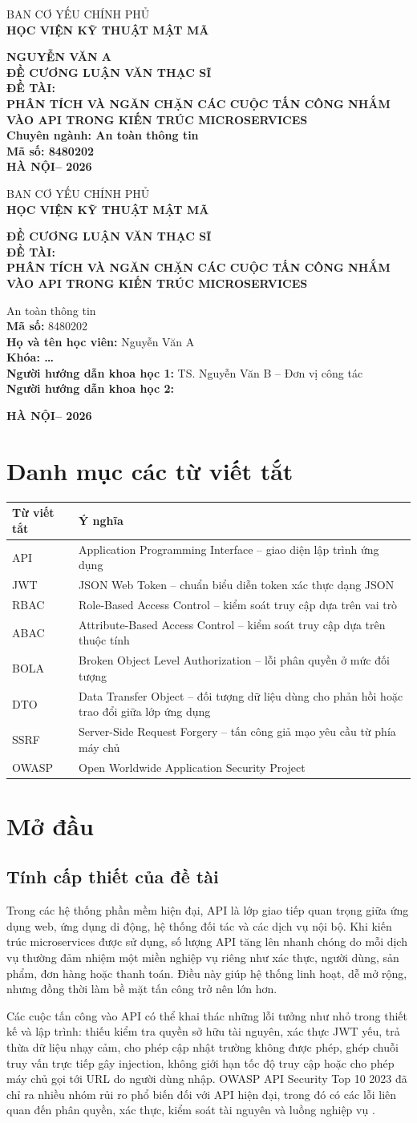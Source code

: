 \documentclass[14pt,a4paper]{extarticle}
\newcommand{\studentname}{Nguyễn Văn A}
\newcommand{\studentclass}{Khóa: \ldots}
\newcommand{\major}{An toàn thông tin}
\newcommand{\majorcode}{8480202}
\newcommand{\supervisorone}{TS. Nguyễn Văn B -- Đơn vị công tác}
\newcommand{\supervisortwo}{}
\newcommand{\city}{HÀ NỘI}
\newcommand{\yearnumber}{2026}
\newcommand{\thesistitle}{PHÂN TÍCH VÀ NGĂN CHẶN CÁC CUỘC TẤN CÔNG NHẮM VÀO API TRONG KIẾN TRÚC MICROSERVICES}
\newcommand{\coverHeader}{
  \begin{center}
    {\MakeUppercase{Ban Cơ yếu Chính phủ}}\\
    {\bfseries\MakeUppercase{Học viện Kỹ thuật Mật mã}}
  \end{center}
}
\newcommand{\mainCover}{
  \thispagestyle{empty}
  \coverHeader
  \vspace{3.2cm}
  \begin{center}
    {\bfseries\MakeUppercase{\studentname}}\\[3.2cm]
    {\bfseries\fontsize{20pt}{24pt}\selectfont ĐỀ CƯƠNG LUẬN VĂN THẠC SĨ}\\[1.2cm]
    {\bfseries ĐỀ TÀI:}\\[0.5cm]
    {\bfseries\MakeUppercase{\thesistitle}}\\[1.2cm]
    {\bfseries Chuyên ngành: \major}\\[0.3cm]
    {\bfseries Mã số: \majorcode}\\
    \vfill
    {\bfseries \city -- \yearnumber}
  \end{center}
  \newpage
}
\newcommand{\subCover}{
  \thispagestyle{empty}
  \coverHeader
  \vspace{2.5cm}
  \begin{center}
    {\bfseries\fontsize{20pt}{24pt}\selectfont ĐỀ CƯƠNG LUẬN VĂN THẠC SĨ}\\[1.2cm]
    {\bfseries ĐỀ TÀI:}\\[0.5cm]
    {\bfseries\MakeUppercase{\thesistitle}}\\[1.1cm]
  \end{center}

  \noindent{\bfseries Chuyên ngành:} \major\\
  {\bfseries Mã số:} \majorcode\\[0.5cm]
  {\bfseries Họ và tên học viên:} \studentname\\
  {\bfseries \studentclass}\\[0.5cm]
  {\bfseries Người hướng dẫn khoa học 1:} \supervisorone\\
  \ifx\supervisortwo\empty
  \else
    {\bfseries Người hướng dẫn khoa học 2:} \supervisortwo\\
  \fi

  \vfill
  \begin{center}
    {\bfseries \city -- \yearnumber}
  \end{center}
  \newpage
}
\begin{document}
\mainCover
\subCover

\tableofcontents
\newpage

\section*{Danh mục các từ viết tắt}
\begin{longtable}{p{3cm}p{11cm}}
\toprule
\textbf{Từ viết tắt} & \textbf{Ý nghĩa}\\
\midrule
API & Application Programming Interface -- giao diện lập trình ứng dụng\\
JWT & JSON Web Token -- chuẩn biểu diễn token xác thực dạng JSON\\
RBAC & Role-Based Access Control -- kiểm soát truy cập dựa trên vai trò\\
ABAC & Attribute-Based Access Control -- kiểm soát truy cập dựa trên thuộc tính\\
BOLA & Broken Object Level Authorization -- lỗi phân quyền ở mức đối tượng\\
DTO & Data Transfer Object -- đối tượng dữ liệu dùng cho phản hồi hoặc trao đổi giữa lớp ứng dụng\\
SSRF & Server-Side Request Forgery -- tấn công giả mạo yêu cầu từ phía máy chủ\\
OWASP & Open Worldwide Application Security Project\\
\bottomrule
\end{longtable}
\newpage


\section{Mở đầu}

\subsection{Tính cấp thiết của đề tài}
Trong các hệ thống phần mềm hiện đại, API là lớp giao tiếp quan trọng giữa ứng dụng web, ứng dụng di động, hệ thống đối tác và các dịch vụ nội bộ. Khi kiến trúc microservices được sử dụng, số lượng API tăng lên nhanh chóng do mỗi dịch vụ thường đảm nhiệm một miền nghiệp vụ riêng như xác thực, người dùng, sản phẩm, đơn hàng hoặc thanh toán. Điều này giúp hệ thống linh hoạt, dễ mở rộng, nhưng đồng thời làm bề mặt tấn công trở nên lớn hơn.

Các cuộc tấn công vào API có thể khai thác những lỗi tưởng như nhỏ trong thiết kế và lập trình: thiếu kiểm tra quyền sở hữu tài nguyên, xác thực JWT yếu, trả thừa dữ liệu nhạy cảm, cho phép cập nhật trường không được phép, ghép chuỗi truy vấn trực tiếp gây injection, không giới hạn tốc độ truy cập hoặc cho phép máy chủ gọi tới URL do người dùng nhập. OWASP API Security Top 10 2023 đã chỉ ra nhiều nhóm rủi ro phổ biến đối với API hiện đại, trong đó có các lỗi liên quan đến phân quyền, xác thực, kiểm soát tài nguyên và luồng nghiệp vụ \cite{owasp2023}.
\end{document}

